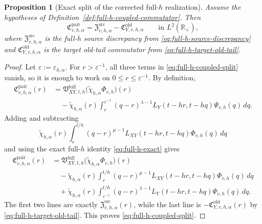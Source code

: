 \documentclass[11pt,a4paper]{amsart}
\theoremstyle{plain}
\newtheorem{proposition}[theorem]{Proposition}
\theoremstyle{definition}
\theoremstyle{remark}
\newcommand{\R}{\mathbb{R}}
\begin{document}
\begin{proposition}[Exact split of the corrected full-\(h\) realization]
\label{prop:full-h-coupled-split}
Assume the hypotheses of Definition~\ref{def:full-h-coupled-commutator}. Then
\begin{equation}\label{eq:full-h-coupled-split}
\mathfrak C_{v,h,\alpha}^{\mathrm{pair}}
=
\mathfrak Z_{v,h,\alpha}^{\mathrm{src}}
-\mathfrak C_{Y,v,h,\alpha}^{\mathrm{old}}
\qquad\text{in }L^2(\R_+),
\end{equation}
where \(\mathfrak Z_{v,h,\alpha}^{\mathrm{src}}\) is the full-\(h\) source discrepancy from
\eqref{eq:full-h-source-discrepancy} and \(\mathfrak C_{Y,v,h,\alpha}^{\mathrm{old}}\) is the target
old-tail commutator from \eqref{eq:full-h-target-old-tail}.
\end{proposition}

\begin{proof}
  Let \(\varepsilon:=\varepsilon_{h,\alpha}\). For \(r>\varepsilon^{-1}\), all three terms in
  \eqref{eq:full-h-coupled-split} vanish, so it is enough to work on \(0\le r\le \varepsilon^{-1}\).
  By definition,
  \begin{align*}
  \mathfrak C_{v,h,\alpha}^{\mathrm{pair}}(r)
  &=
  \mathfrak V_{XY,t,h}^{\mathrm{full}}
  \bigl(
  \widetilde\chi_{h,\alpha}\Phi_{v,h}
  \bigr)(r) \\
  &\quad-
  \widetilde\chi_{h,\alpha}(r)
  \int_r^{\varepsilon^{-1}}
  (q-r)^{\lambda-1}
  L_Y(t-hr,t-hq)\Psi_{v,h}(q)\,dq.
  \end{align*}
  Adding and subtracting
  \[
  \widetilde\chi_{h,\alpha}(r)
  \int_r^{t/h}
  (q-r)^{\mu-1}
  L_{XY}(t-hr,t-hq)\Phi_{v,h}(q)\,dq
  \]
  and using the exact full-\(h\) identity \eqref{eq:full-h-exact} gives
  \begin{align*}
  \mathfrak C_{v,h,\alpha}^{\mathrm{pair}}(r)
  &=
  \mathfrak V_{XY,t,h}^{\mathrm{full}}
  \bigl(
  \widetilde\chi_{h,\alpha}\Phi_{v,h}
  \bigr)(r) \\
  &\quad-
  \widetilde\chi_{h,\alpha}(r)
  \int_r^{t/h}
  (q-r)^{\mu-1}
  L_{XY}(t-hr,t-hq)\Phi_{v,h}(q)\,dq \\
  &\quad+
  \widetilde\chi_{h,\alpha}(r)
  \int_{\varepsilon^{-1}}^{t/h}
  (q-r)^{\lambda-1}
  L_Y(t-hr,t-hq)\Psi_{v,h}(q)\,dq.
  \end{align*}
  The first two lines are exactly \(\mathfrak Z_{v,h,\alpha}^{\mathrm{src}}(r)\), while the last line
  is \(-\mathfrak C_{Y,v,h,\alpha}^{\mathrm{old}}(r)\) by
  \eqref{eq:full-h-target-old-tail}. This proves \eqref{eq:full-h-coupled-split}.
\end{proof}
\end{document}
